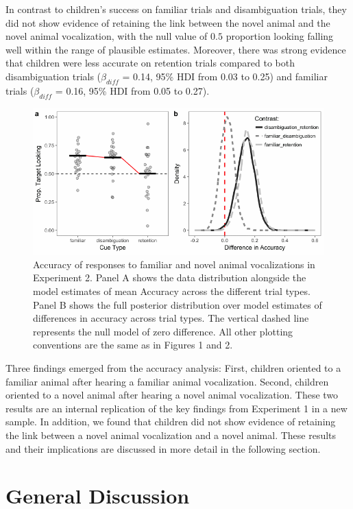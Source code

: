 \documentclass[english,floatsintext,man]{apa6}
\theoremstyle{definition}
\theoremstyle{definition}
\theoremstyle{definition}
\theoremstyle{remark}
\begin{document}
In contrast to children's success on familiar trials and disambiguation
trials, they did not show evidence of retaining the link between the
novel animal and the novel animal vocalization, with the null value of
\(0.5\) proportion looking falling well within the range of plausible
estimates. Moreover, there was strong evidence that children were less
accurate on retention trials compared to both disambiguation trials
(\(\beta_{diff}\) = 0.14, 95\% HDI from 0.03 to 0.25) and familiar
trials (\(\beta_{diff}\) = 0.16, 95\% HDI from 0.05 to 0.27).

\begin{figure}[t]

{\centering \includegraphics[width=0.8\linewidth]{anime_manuscript_files/figure-latex/acc-plot-e2-1} 

}

\caption{Accuracy of responses to familiar and novel animal vocalizations in Experiment 2. Panel A shows the data distribution alongside the model estimates of mean Accuracy across the different trial types. Panel B shows the full posterior distribution over model estimates of differences in accuracy across trial types. The vertical dashed line represents the null model of zero difference. All other plotting conventions are the same as in Figures 1 and 2.}\label{fig:acc-plot-e2}
\end{figure}

Three findings emerged from the accuracy analysis: First, children
oriented to a familiar animal after hearing a familiar animal
vocalization. Second, children oriented to a novel animal after hearing
a novel animal vocalization. These two results are an internal
replication of the key findings from Experiment 1 in a new sample. In
addition, we found that children did not show evidence of retaining the
link between a novel animal vocalization and a novel animal. These
results and their implications are discussed in more detail in the
following section.

\hypertarget{general-discussion}{%
\section{General Discussion}\label{general-discussion}}
\end{document}
